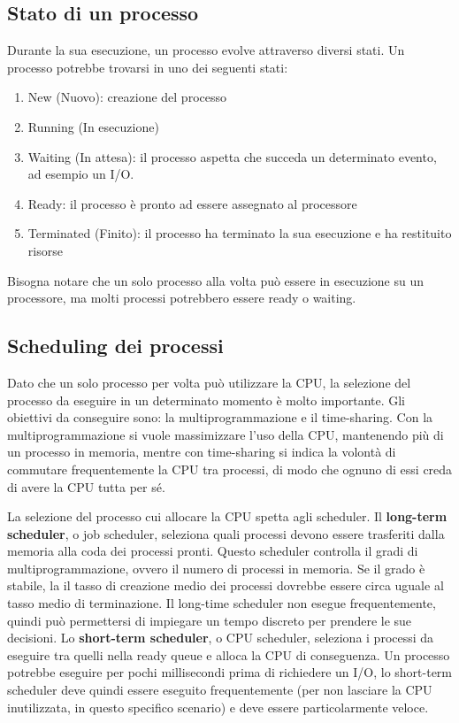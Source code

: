 \documentclass[a4paper]{article}
\begin{document}
\subsection{Stato di un processo}
Durante la sua esecuzione, un processo evolve attraverso diversi stati. Un processo potrebbe trovarsi in uno dei seguenti stati:
\begin{enumerate}
    \item New (Nuovo): creazione del processo
    \item Running (In esecuzione)
    \item Waiting (In attesa): il processo aspetta che succeda un determinato evento, ad esempio un I/O.
    \item Ready: il processo è pronto ad essere assegnato al processore
    \item Terminated (Finito): il processo ha terminato la sua esecuzione e ha restituito risorse
\end{enumerate}

Bisogna notare che un solo processo alla volta può essere in esecuzione su un processore, ma molti processi potrebbero essere ready o waiting.

\subsection{Scheduling dei processi}
Dato che un solo processo per volta può utilizzare la CPU, la selezione del processo da eseguire in un determinato momento è molto importante. Gli obiettivi da conseguire sono: la multiprogrammazione e il time-sharing. Con la multiprogrammazione si vuole massimizzare l'uso della CPU, mantenendo più di un processo in memoria, mentre con time-sharing si indica la volontà di commutare frequentemente la CPU tra processi, di modo che ognuno di essi creda di avere la CPU tutta per sé.

La selezione del processo cui allocare la CPU spetta agli scheduler. \newline
Il \textbf{long-term scheduler}, o job scheduler, seleziona quali processi devono essere trasferiti dalla memoria alla coda dei processi pronti. Questo scheduler controlla il gradi di multiprogrammazione, ovvero il numero di processi in memoria. Se il grado è stabile, la il tasso di creazione medio dei processi dovrebbe essere circa uguale al tasso medio di terminazione. Il long-time scheduler non esegue frequentemente, quindi può permettersi di impiegare un tempo discreto per prendere le sue decisioni. Lo \textbf{short-term scheduler}, o CPU scheduler, seleziona i processi da eseguire tra quelli nella ready queue e alloca la CPU di conseguenza. Un processo potrebbe eseguire per pochi millisecondi prima di richiedere un I/O, lo short-term scheduler deve quindi essere eseguito frequentemente (per non lasciare la CPU inutilizzata, in questo specifico scenario) e deve essere particolarmente veloce.
\end{document}
